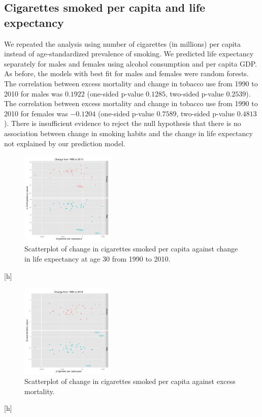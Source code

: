 \documentclass{article}
\begin{document}
\clearpage
\subsection{Cigarettes smoked per capita and life expectancy}
We repeated the analysis using number of cigarettes (in millions) per capita instead of age-standardized prevalence of smoking.  We predicted life expectancy separately for males and females using alcohol consumption and per capita GDP.  As before, the models with best fit for males and females were random forests.  The correlation between excess mortality and change in tobacco use from 1990 to 2010 for males was $0.1922$ (one-sided p-value $0.1285$, two-sided p-value $0.2539$).  The correlation between excess mortality and change in tobacco use from 1990 to 2010 for females was $-0.1204$ (one-sided p-value $0.7589$, two-sided p-value $0.4813$).  There is insufficient evidence to reject the null hypothesis that there is no association between change in smoking habits and the change in life expectancy not explained by our prediction model.


\begin{figure}[h]
\centering
\includegraphics[width = 0.4\textwidth]{plots/smoking_lifeexp.pdf}
\caption{Scatterplot of change in cigarettes smoked per capita against change in life expectancy at age 30 from 1990 to 2010.}\label{fig:smoking_lifeexp}
\end{figure}[h]

\begin{figure}[h]
\centering
\includegraphics[width = 0.4\textwidth]{plots/smoking_exmort.pdf}
\caption{Scatterplot of change in cigarettes smoked per capita against excess mortality.}\label{fig:smoking_excessmortality}
\end{figure}[h]
\end{document}
